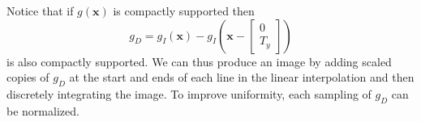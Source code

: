 \documentclass{article}
\let\V\mathbf
\begin{document}
Notice that if $g(\V x)$ is compactly supported then
\[
g_D = g_I(\V x) - g_I\left(\V x - \begin{bmatrix}0\\T_y\end{bmatrix}\right)
\]
is also compactly supported.  We can thus produce an image by adding scaled copies of $g_D$ at the start and ends of each line in the linear interpolation and then discretely integrating the image.  To improve uniformity, each sampling of $g_D$ can be normalized.
\end{document}

